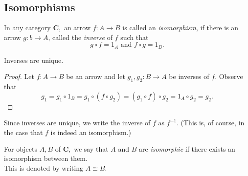 \subsection{Isomorphisms}
\begin{defn} 
	In any category $\mathbf{C},$ an arrow $f:A\to B$ is called an \emph{isomorphism}, if there is an arrow $g:b\to A$, called the \emph{inverse} of $f$ such that
	\begin{equation*} 
		g\circ f = 1_A \text{ and } f\circ g = 1_B.
	\end{equation*}
\end{defn}
\begin{lem} 
	Inverses are unique.
\end{lem}
\begin{proof} 
	Let $f:A\to B$ be an arrow and let $g_1, g_2:B\to A$ be inverses of $f.$ Observe that
	\begin{equation*} 
		g_1 = g_1 \circ 1_B = g_1 \circ (f \circ g_2) = (g_1 \circ f) \circ g_2 = 1_A \circ g_2 = g_2.
	\end{equation*}
\end{proof}
Since inverses are unique, we write the inverse of $f$ as $f^{-1}.$ (This is, of course, in the case that $f$ is indeed an isomorphism.)\\
\begin{defn} 
	For objects $A, B$ of $\mathbf{C},$ we say that $A$ and $B$ are \emph{isomorphic} if there exists an isomorphism between them.\\
	This is denoted by writing $A \cong B.$
\end{defn}
